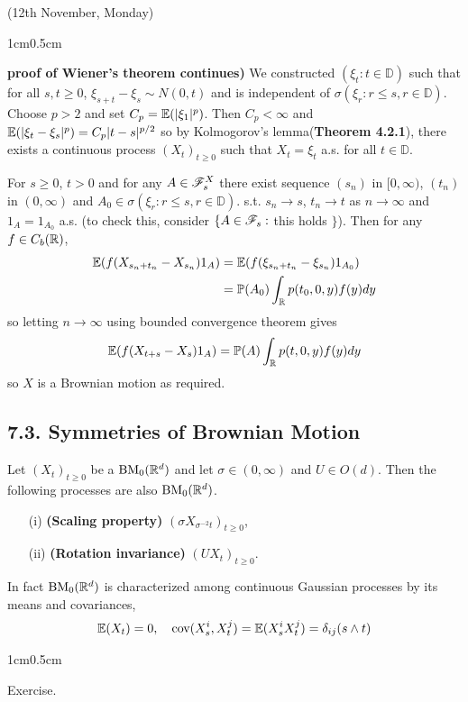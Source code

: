 \documentclass[10pt,a4paper]{report}
\newenvironment{proof}
{\begin{changemargin}{1cm}{0.5cm} 
	}%
	{\end{changemargin}
}
\begin{document}
\newday

(12th November, Monday)
\s

\begin{proof}
\textbf{proof of Wiener's theorem continues)} We constructed $(\xi_t : t\in \mathbb{D})$ such that for all $s,t\geq 0$, $\xi_{s+t} -\xi_s \sim N(0,t)$ and is independent of $\sigma(\xi_r : r\leq s , r\in \mathbb{D})$. Choose $p>2$ and set $C_p = \mathbb{E}(|\xi_1|^p)$. Then $C_p <\infty$ and $\mathbb{E}(|\xi_t - \xi_s|^p) = C_p|t-s|^{p/2}$ so by Kolmogorov's lemma(\textbf{Theorem 4.2.1}), there exists a continuous process $(X_t)_{t\geq 0}$ such that $X_t = \xi_t$ a.s. for all $t\in \mathbb{D}$.
\s

For $s\geq 0$, $t>0$ and for any $A\in \mathscr{F}_s^X$ there exist sequence $(s_n)$ in $[0,\infty)$, $(t_n)$ in $(0,\infty)$ and $A_0 \in \sigma(\xi_r : r\leq s, r \in \mathbb{D} )$. s.t. $s_n \rightarrow s$, $t_n \rightarrow t$ as $n\rightarrow \infty$ and $1_A =1_{A_0}$ a.s. (to check this, consider $\{ A \in \mathscr{F}_s : $ this holds $\}$). Then for any $f\in C_b(\mathbb{R})$,
\begin{align*}
\mathbb{E}(f (X_{s_n + t_n} - X_{s_n})1_A) &= \mathbb{E}( f(\xi_{s_n + t_n} - \xi_{s_n})1_{A_0} ) \\
&= \mathbb{P}(A_0) \int_{\mathbb{R}} p(t_0, 0,y) f(y)dy
\end{align*}
so letting $n\rightarrow \infty$ using bounded convergence theorem gives
\begin{align*}
\mathbb{E}(f(X_{t+s}-X_s)1_{A}) = \mathbb{P}(A) \int_{\mathbb{R}} p(t,0,y) f(y)dy
\end{align*}
so $X$ is a Brownian motion as required.

\eop
\end{proof}

\subsection*{7.3. Symmetries of Brownian Motion}

 Let $(X_t)_{t\geq 0}$ be a $\text{BM}_0(\mathbb{R}^d)$ and let $\sigma \in (0,\infty)$ and $U\in O(d)$. Then the following processes are also $\text{BM}_0(\mathbb{R}^d)$.
\begin{itemize}
\item[(i)] \textbf{(Scaling property)} $(\sigma X_{\sigma^{-2}t})_{t\geq 0}$,
\item[(ii)] \textbf{(Rotation invariance)} $(UX_t)_{t\geq 0}$.
\end{itemize}
In fact $\text{BM}_0(\mathbb{R}^d)$ is characterized among continuous Gaussian processes by its means and covariances,
\begin{align*}
\mathbb{E}(X_t) =0, \quad \text{cov}(X_s^i, X_t^j) = \mathbb{E}(X^i_s X^j_t) = \delta_{ij} (s\wedge t)
\end{align*}
\begin{proof}
\pf Exercise.
\end{proof}
\end{document}
